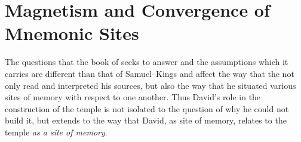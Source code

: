 
\section{Magnetism and Convergence of Mnemonic Sites}

The questions that the book of \chronicles seeks to answer and the assumptions which it carries are different than that of Samuel--Kings and affect the way that the \chronicler not only read and interpreted his sources, but also the way that he situated various sites of memory with respect to one another. Thus David's role in the construction of the temple is not isolated to the question of why he could not build it, but extends to the way that David, as site of memory, relates to the temple \emph{as a site of memory}.

